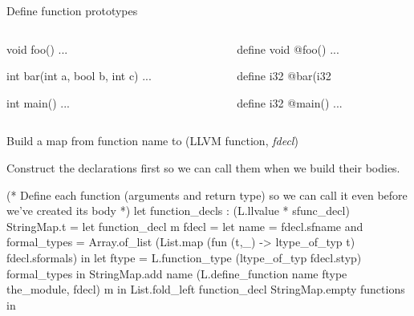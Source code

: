 \documentclass{plt}
\begin{document}
\begin{frame}[fragile=singleslide]{Define function prototypes}

\begin{columns}
\begin{column}{0.5\textwidth}
\begin{C}
void foo() ...

int bar(int a, bool b, int c) ...

int main() ...
\end{C}
\end{column}
\begin{column}{0.5\textwidth}
\begin{llvm}
define void @foo() ...

define i32 @bar(i32 %

define i32 @main() ...
\end{llvm}
\end{column}
\end{columns}

Build a map from function name to (LLVM function, \emph{fdecl})

Construct the declarations first so we can call them when we build
their bodies.

\begin{ocaml}
(* Define each function (arguments and return type) so we can 
   call it even before we've created its body *)
let function_decls : (L.llvalue * sfunc_decl) StringMap.t =
  let function_decl m fdecl =
    let name = fdecl.sfname
    and formal_types = Array.of_list
         (List.map (fun (t,_) -> ltype_of_typ t) fdecl.sformals)
    in let ftype =
       L.function_type (ltype_of_typ fdecl.styp) formal_types in
    StringMap.add name (L.define_function name ftype the_module,
                        fdecl) m in
  List.fold_left function_decl StringMap.empty functions in
\end{ocaml}
\end{frame}
\end{document}
